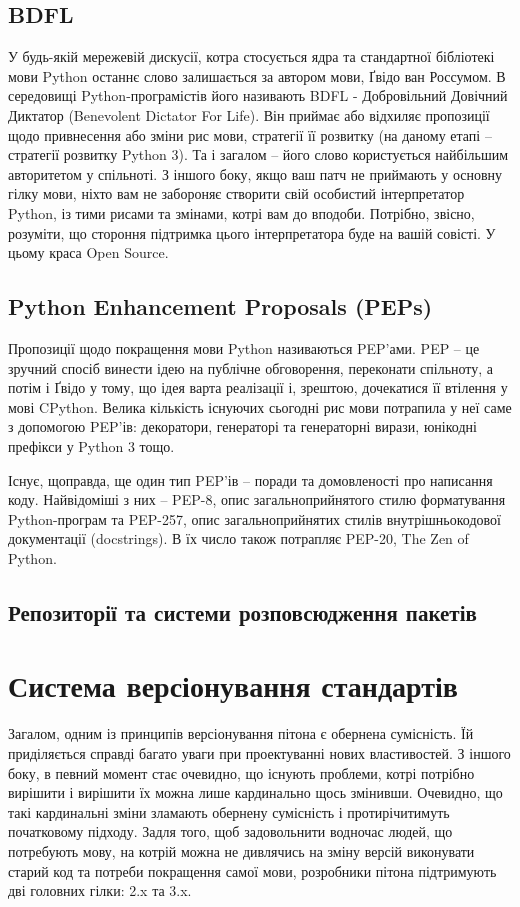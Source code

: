 \documentclass[a4paper, 12pt, onsedie]{article}
\begin{document}
\subsection{BDFL}
    У будь-якій мережевій дискусії, котра стосується ядра та стандартної бібліотекі мови Python
    останнє слово залишається за автором мови, Ґвідо ван Россумом. В середовищі Python-програмістів
    його називають BDFL - Добровільний Довічний Диктатор (Benevolent Dictator For Life). Він приймає або
    відхиляє пропозиції щодо привнесення або зміни рис мови, стратегії її розвитку (на даному етапі -- 
    стратегії розвитку Python 3). Та і загалом -- його слово користується найбільшим авторитетом у
    спільноті.
    З іншого боку, якщо ваш патч не приймають у основну гілку мови, ніхто вам не забороняє створити
    свій особистий інтерпретатор Python, із тими рисами та змінами, котрі вам до вподоби. Потрібно,
    звісно, розуміти, що стороння підтримка цього інтерпретатора буде на вашій совісті. У цьому краса
    Open Source.

\subsection{Python Enhancement Proposals (PEPs)}
    Пропозиції щодо покращення мови Python називаються PEP'ами. PEP -- це зручний спосіб винести ідею
    на публічне обговорення, переконати спільноту, а потім і Ґвідо у тому, що ідея варта реалізації і,
    зрештою, дочекатися її втілення у мові CPython. Велика кількість існуючих сьогодні рис мови потрапила
    у неї саме з допомогою PEP'ів: декоратори, генераторі та генераторні вирази, юнікодні префікси у 
    Python 3 тощо.

    Існує, щоправда, ще один тип  PEP'ів -- поради та домовленості про написання коду. Найвідоміші 
    з них -- PEP-8, опис загальноприйнятого стилю форматування Python-програм та PEP-257, опис
    загальноприйнятих стилів внутрішньокодової документації (docstrings). В їх число також потрапляє
    PEP-20, The Zen of Python.

\subsection{Репозиторії та системи розповсюдження пакетів}

\section{Система версіонування стандартів}
Загалом, одним із принципів версіонування пітона є обернена сумісність. Їй приділяється 
справді багато уваги при проектуванні нових властивостей. З іншого боку, в певний момент 
стає очевидно, що існують проблеми, котрі потрібно вирішити і вирішити їх можна лише 
кардинально щось змінивши. Очевидно, що такі кардинальні зміни зламають обернену сумісність
і протирічитимуть початковому підходу. Задля того, щоб задовольнити водночас людей, що 
потребують мову, на котрій можна не дивлячись на зміну версій виконувати старий код та 
потреби покращення самої мови, розробники пітона підтримують дві головних гілки: 2.x та 3.x.
\end{document}
